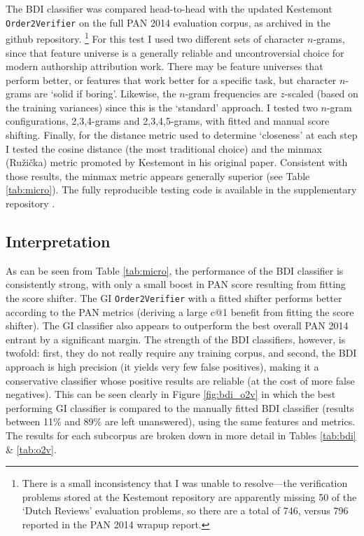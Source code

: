 \documentclass[
    hf
]{ceurart}
\begin{document}
The BDI classifier was compared head-to-head with the updated Kestemont
\texttt{Order2Verifier} on the full PAN 2014 evaluation corpus, as archived in
the github repository.%
%
\footnote{ There is a small inconsistency that I was unable to resolve---the
    verification problems stored at the Kestemont repository are apparently
    missing 50 of the `Dutch Reviews' evaluation problems, so there are a total
    of 746, versus 796 reported in the PAN 2014 wrapup report.
}
%
For this test I used two different sets of character $n$-grams, since that
feature universe is a generally reliable and uncontroversial choice for modern
authorship attribution work. There may be feature universes that perform better,
or features that work better for a specific task, but character $n$-grams are
`solid if boring'. Likewise, the $n$-gram frequencies are $z$-scaled (based on
the training variances) since this is the `standard' approach. I tested two
$n$-gram configurations, 2,3,4-grams and 2,3,4,5-grams, with fitted and manual
score shifting. Finally, for the distance metric used to determine `closeness'
at each step I tested the cosine distance (the most traditional choice) and the
minmax (Ružička) metric promoted by Kestemont in his original paper. Consistent
with those results, the minmax metric appears generally superior (see Table
\ref{tab:micro}). The fully reproducible testing code is available in the
supplementary repository \cite{nagy_bdi_2024}.

\subsection{Interpretation}

As can be seen from Table \ref{tab:micro}, the performance of the BDI classifier
is consistently strong, with only a small boost in PAN score resulting from
fitting the score shifter. The GI \texttt{Order2Verifier} with a fitted shifter
performs better according to the PAN metrics (deriving a large c@1 benefit from
fitting the score shifter). The GI classifier also appears to outperform the
best overall PAN 2014 entrant by a significant margin. The strength of the BDI
classifiers, however, is twofold: first, they do not really require any training
corpus, and second, the BDI approach is high precision (it yields very few false
positives), making it a conservative classifier whose positive results are
reliable (at the cost of more false negatives). This can be seen clearly in
Figure \ref{fig:bdi_o2v} in which the best performing GI classifier is compared
to the manually fitted BDI classifier (results between 11\% and 89\% are left
unanswered), using the same features and metrics. The results for each subcorpus
are broken down in more detail in Tables \ref{tab:bdi} \& \ref{tab:o2v}.
\end{document}

